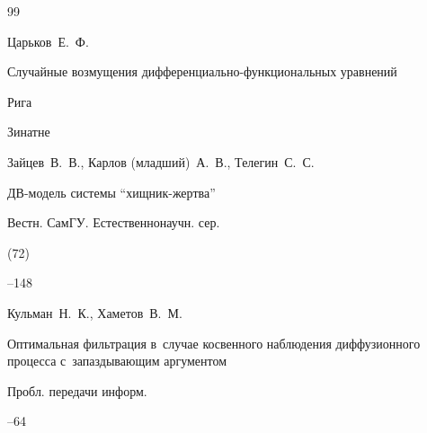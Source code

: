 \RusRef





\begin{thebibliography}{99}




\by Царьков~Е.~Ф.

\book  Случайные возмущения дифференциально-функциональных уравнений

\publaddr Рига

\publ Зинатне 






\by Зайцев~В.~В., Карлов (младший)~А.~В., Телегин~С.~С.

\paper ДВ-модель системы ``хищник-жертва''

\jour Вестн. СамГУ. Естественнонаучн. сер.


(72)

--148





\by Кульман~Н.~К., Хаметов~В.~М.

\paper Оптимальная фильтрация в~случае косвенного наблюдения диффузионного процесса с~запаздывающим аргументом

\jour Пробл. передачи информ.




--64














\end{thebibliography}
